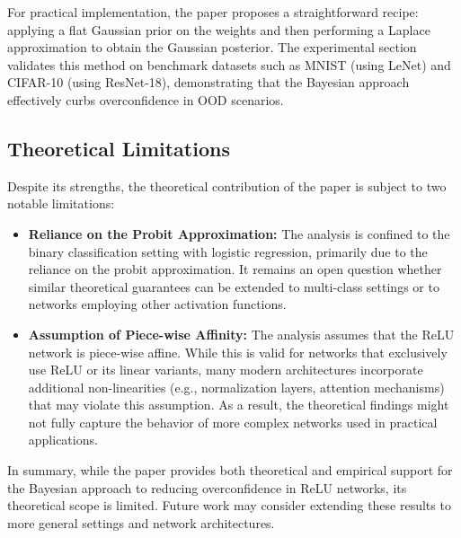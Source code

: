 \documentclass{article} %
\begin{document}
For practical implementation, the paper proposes a straightforward recipe: applying a flat Gaussian prior on the weights and then performing a Laplace approximation to obtain the Gaussian posterior. The experimental section validates this method on benchmark datasets such as MNIST (using LeNet) and CIFAR-10 (using ResNet-18), demonstrating that the Bayesian approach effectively curbs overconfidence in OOD scenarios.

\subsection*{Theoretical Limitations}

Despite its strengths, the theoretical contribution of the paper is subject to two notable limitations:

\begin{itemize}
    \item \textbf{Reliance on the Probit Approximation:}  
    The analysis is confined to the binary classification setting with logistic regression, primarily due to the reliance on the probit approximation. It remains an open question whether similar theoretical guarantees can be extended to multi-class settings or to networks employing other activation functions.
    
    \item \textbf{Assumption of Piece-wise Affinity:}  
    The analysis assumes that the ReLU network is piece-wise affine. While this is valid for networks that exclusively use ReLU or its linear variants, many modern architectures incorporate additional non-linearities (e.g., normalization layers, attention mechanisms) that may violate this assumption. As a result, the theoretical findings might not fully capture the behavior of more complex networks used in practical applications.
\end{itemize}

In summary, while the paper provides both theoretical and empirical support for the Bayesian approach to reducing overconfidence in ReLU networks, its theoretical scope is limited. Future work may consider extending these results to more general settings and network architectures.
\end{document}
